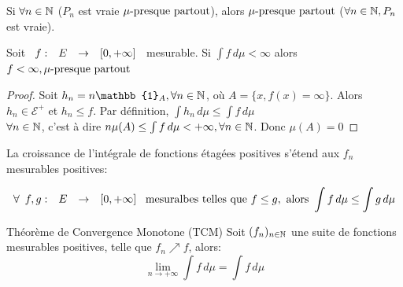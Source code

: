 \documentclass[]{report}
\begin{document}
    \begin{exo}{}{}
        Si $\forall n\in\mathbb{N}$ ($P_n$ est vraie $\mu\text{-presque partout}$), alors $\mu\text{-presque partout}$ ($\forall n\in\mathbb{N},P_n$ est vraie).
    \end{exo}

    \begin{lm}{}{}
        Soit $\begin{array}{ccccc} f : & E & \to & [0,+\infty] \end{array}$ mesurable. Si $\int f\, d\mu<\infty$ alors $f<\infty,\mu\text{-presque partout}$
    \end{lm}

    \begin{proof}{}{}
        Soit $h_n=n\mathbb{1}_{A},\forall n\in\N$, où $A=\{x,f(x)=\infty\}$. Alors $h_n\in \mathcal{E}^+$ et $h_n\le f$. Par définition, $\int h_n\,d\mu\le \int f\,d\mu$\\
        $\forall n\in\mathbb{N}$, c'est à dire $n\mu(A)\le \int f\,d\mu<+\infty,\forall n\in\mathbb{N}$. Donc $\mu(A)=0$
    \end{proof}

    La croissance de l'intégrale de fonctions étagées positives s'étend aux $f_n$ mesurables positives:

    \begin{prop}{}{}
        \[\forall \begin{array}{ccccc} f,g : & E & \to & [0,+\infty] \end{array}\text{ mesuralbes telles que }f\le g,\text{ alors }\int f\,d\mu\le \int g\,d\mu\]
    \end{prop}

    \begin{tm}{Théorème de Convergence Monotone (TCM)}{}
        Soit $(f_n)_{n\in\mathbb{N}}$ une suite de fonctions mesurables positives, telle que $f_n\nearrow f$, alors:
        \[\underset{n\to+\infty}{\lim}\int f\,d\mu= \int f\,d\mu\]
    \end{tm}
\end{document}
